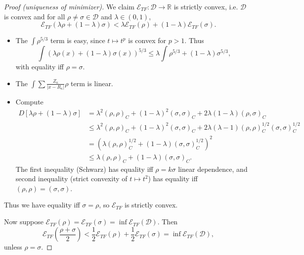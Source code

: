 \documentclass[11pt]{amsart}
\newcommand{\R}{\mathbb{R}}
\theoremstyle{definition}
\theoremstyle{definition}
\theoremstyle{definition}
\numberwithin{equation}{section}
\begin{document}
\begin{proof}[Proof (uniqueness of minimizer)]
We claim $\mathcal{E}_{TF}:\mathcal{D}\to\R$ is strictly convex, i.e. $\mathcal{D}$ is convex and for all $\rho\ne\sigma\in\mathcal{D}$ and $\lambda\in(0,1)$,
\[
\mathcal{E}_{TF}(\lambda\rho+(1-\lambda)\sigma)<\lambda\mathcal{E}_{TF}(\rho)+(1-\lambda)\mathcal{E}_{TF}(\sigma).
\]
\begin{itemize}
\item The $\int\rho^{5/3}$ term is easy, since $t\mapsto t^p$ is convex for $p>1$. Thus
\[
\int(\lambda\rho(x)+(1-\lambda)\sigma(x))^{5/3}\le\lambda\int\rho^{5/3}+(1-\lambda)\sigma^{5/3},
\]
with equality iff $\rho=\sigma$.
\item The $\int\sum\frac{Z_\kappa}{|x-R_\kappa|}\rho$ term is linear.
\item Compute
\begin{align*}
D[\lambda\rho+(1-\lambda)\sigma]&=\lambda^2(\rho,\rho)_C+(1-\lambda)^2(\sigma,\sigma)_C+2\lambda(1-\lambda)(\rho,\sigma)_C\\
&\le \lambda^2(\rho,\rho)_C+(1-\lambda)^2(\sigma,\sigma)_C+2\lambda(\lambda-1)(\rho,\rho)_C^{1/2}(\sigma,\sigma)_C^{1/2}\\
&=(\lambda(\rho,\rho)_C^{1/2}+(1-\lambda)(\sigma,\sigma)_C^{1/2})^2\\
&\le\lambda(\rho,\rho)_C+(1-\lambda)(\sigma,\sigma)_C.
\end{align*}
The first inequality (Schwarz) has equality iff $\rho=k\sigma$ linear dependence, and second inequality (strict convexity of $t\mapsto t^2$) has equality iff $(\rho,\rho)=(\sigma,\sigma)$. 
\end{itemize}
Thus we have equality iff $\sigma=\rho$, so $\mathcal{E}_{TF}$ is strictly convex. 

Now suppose $\mathcal{E}_{TF}(\rho)=\mathcal{E}_{TF}(\sigma)=\inf\mathcal{E}_{TF}(\mathcal{D})$. Then
\[
\mathcal{E}_{TF}\left(\frac{\rho+\sigma}{2}\right)<\frac{1}{2}\mathcal{E}_{TF}(\rho)+\frac{1}{2}\mathcal{E}_{TF}(\sigma)=\inf\mathcal{E}_{TF}(\mathcal{D}),
\]
unless $\rho=\sigma$.



\end{proof}
\end{document}
